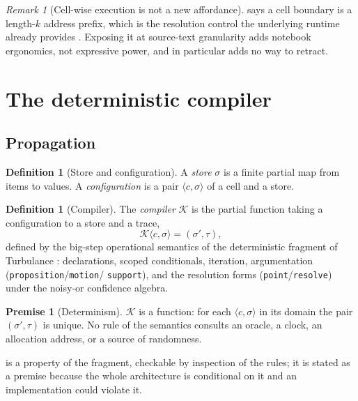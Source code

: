 \documentclass[twocolumn,11pt,a4paper]{article}
\theoremstyle{sup}
\theoremstyle{definition}
\newtheorem{definition}[theorem]{Definition}
\newtheorem{axiom}{Premise}
\theoremstyle{remark}
\newtheorem{remark}[theorem]{Remark}
\newcommand{\Cmp}{\mathcal{K}}
\begin{document}
\begin{remark}[Cell-wise execution is not a new affordance]
\label{rem:cells-old}
 says a cell boundary is a length-$k$ address prefix,
which is the resolution control the underlying runtime already provides
\citep{sachikonye2025runtime}. Exposing it at source-text granularity adds
notebook ergonomics, not expressive power, and in particular adds no way to
retract.
\end{remark}

\section{The deterministic compiler}
\label{sec:compiler}

\subsection{Propagation}

\begin{definition}[Store and configuration]
\label{def:config}
A \emph{store} $\sigma$ is a finite partial map from items to values. A
\emph{configuration} is a pair $\langle c,\sigma\rangle$ of a cell and a store.
\end{definition}

\begin{definition}[Compiler]
\label{def:compiler}
The \emph{compiler} $\Cmp$ is the partial function taking a configuration to a
store and a trace,
\[
\Cmp\langle c,\sigma\rangle=(\sigma',\tau),
\]
defined by the big-step operational semantics of the deterministic fragment of
Turbulance \citep{sachikonye2025grammar}: declarations, scoped conditionals,
iteration, argumentation (\lstinline{proposition}/\lstinline{motion}/
\lstinline{support}), and the resolution forms
(\lstinline{point}/\lstinline{resolve}) under the noisy-or confidence algebra.
\end{definition}

\begin{axiom}[Determinism]
\label{ax:det}
$\Cmp$ is a function: for each $\langle c,\sigma\rangle$ in its domain the pair
$(\sigma',\tau)$ is unique. No rule of the semantics consults an oracle, a
clock, an allocation address, or a source of randomness.
\end{axiom}

 is a property of the fragment, checkable by inspection of the
rules; it is stated as a premise because the whole architecture is conditional
on it and an implementation could violate it.
\end{document}
